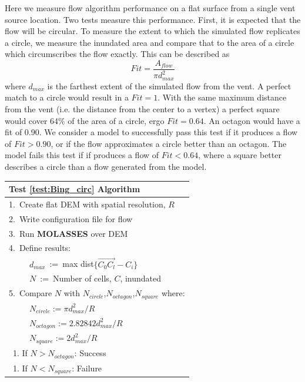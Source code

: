 \documentclass[12pt,letter]{article}
\newcommand{\tabitem}{~~\llap{\textbullet}~~}
\begin{document}
			Here we measure flow algorithm performance on a flat surface from a single vent source location. Two tests measure this performance. First, it is expected that the flow will be circular. To measure the extent to which the simulated flow replicates a circle, we measure the inundated area and compare that to the area of a circle which circumscribes the flow exactly. This can be described as
			\begin{equation}
				Fit = \frac{A_{flow}}{\pi d_{max}^2}
			\end{equation}
			where $d_{max}$ is the farthest extent of the simulated flow from the vent. A perfect match to a circle would result in a $Fit=1$. With the same maximum distance from the vent (i.e. the distance from the center to a vertex) a perfect square would cover 64\% of the area of a circle, ergo $Fit=0.64$. An octagon would have a fit of 0.90. We consider a model to successfully pass this test if it produces a flow of $Fit>0.90$, or if the flow approximates a circle better than an octagon. The model fails this test if if produces a flow of $Fit<0.64$, where a square better describes a circle than a flow generated from the model.

			\begin{center}
				\begin{tabular}{l}
					\toprule
					\textbf{Test \ref{test:Bing_circ} Algorithm}\\
					\midrule
					1.~Create flat DEM with spatial resolution, $R$\\
					2.~Write configuration file for flow\\
					3.~Run \textbf{MOLASSES} over DEM\\
					4.~Define results:\\
						~\tabitem $d_{max}$~:=~max dist$\{\overrightarrow{C_0C_l}-C_i\}$\\
						~\tabitem $N$~:=~Number of cells, $C$, inundated\\
					5.~Compare $N$ with $N_{circle}$,$N_{octagon}$,$N_{square}$ where:\\
						~\tabitem $N_{circle}:=\pi d_{max}^2/R$\\
						~\tabitem $N_{octagon}:=2.82842 d_{max}^2/R$\\
						~\tabitem $N_{square}:=2d_{max}^2/R$\\
						~1. If $N>N_{octagon}$: Success\\
						~1. If $N<N_{square}$: Failure\\
					\bottomrule
				\end{tabular}
			\end{center}
\end{document}
